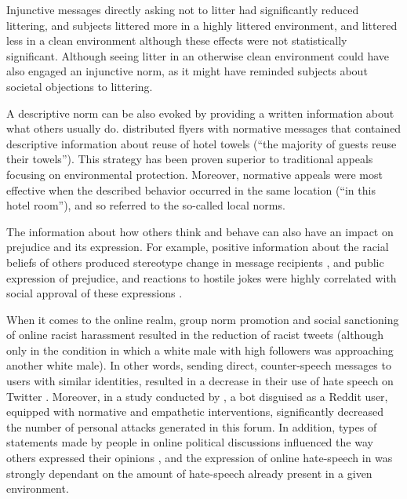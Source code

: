 \documentclass[preprint,12pt]{elsarticle}
\begin{document}
Injunctive messages directly asking not to litter had significantly reduced littering, and subjects littered more in a highly littered environment, and littered less in a clean environment although these effects were not statistically significant. %
Although seeing litter in an otherwise clean environment could have also engaged an injunctive norm, as it might have reminded subjects about societal objections to littering.


A descriptive norm can be also evoked by providing a written information about what others usually do. \citet{goldstein2008room} distributed flyers with normative messages that contained descriptive information about reuse of hotel towels (“the majority of guests reuse their towels”). This strategy has been proven superior to traditional appeals focusing on environmental protection. Moreover, normative appeals were most effective when the described behavior occurred in the same location (“in this hotel  room”), and so referred to the so-called local norms. 

The information about how others think and behave can also have an impact on prejudice and its expression. For example, positive information about the racial beliefs of others produced stereotype change in message recipients \citep{stangor2001changing}, and public expression of prejudice, and reactions to hostile jokes were highly correlated with social approval of these expressions \citep{crandall2002social}. 

When it comes to the online realm, group norm promotion and social sanctioning of online racist harassment resulted in the reduction of racist tweets (although only in the condition in which a white male with high followers was approaching another white male). In other words, sending direct, counter-speech messages to users with similar identities,  resulted in a decrease in their use of hate speech on Twitter \citep{munger2017tweetment}. Moreover, in a study conducted by \citet{bilewicz2021artificial}, a bot disguised as a Reddit user, equipped with normative and empathetic interventions, significantly decreased the number of personal attacks generated in this forum. In addition, types of statements made by people in online political discussions influenced the way others expressed their opinions \citep{price2006normative}, and the expression of online hate-speech in  \citep{alvarez2018normative} was strongly dependant on the amount of hate-speech already present in a given environment.  
\end{document}
